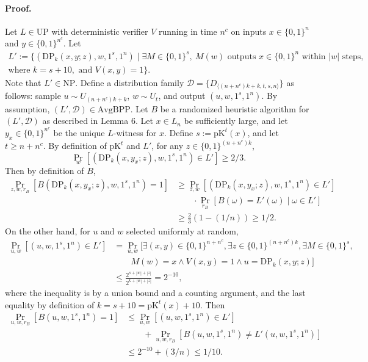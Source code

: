 \documentclass[10pt,a4paper]{article}
\begin{document}
\paragraph{Proof.} Let $L\in\mathrm{UP}$ with deterministic verifier $V$ running in time $n^c$ on inputs $x\in\{0,1\}^n$ and $y\in\{0,1\}^{n^c}$. Let
\begin{multline*}
L':=\{(\mathrm{DP}_k(x,y;z),w,1^s,1^n)\mid\exists M\in\{0,1\}^s,\ M(w)\text{ outputs }x\in\{0,1\}^n\text{ within }|w|\text{ steps},\\
\text{where }k=s+10,\text{ and }V(x,y)=1\}.
\end{multline*}
Note that $L'\in\mathrm{NP}$. Define a distribution family $\mathcal D=\{D_{\langle(n+n^c)k+k,t,s,n\rangle}\}$ as follows: sample $u\sim U_{(n+n^c)k+k}$, $w\sim U_t$, and output $(u,w,1^s,1^n)$. By assumption, $(L',\mathcal D)\in\mathrm{AvgBPP}$. Let $B$ be a randomized heuristic algorithm for $(L',\mathcal D)$ as described in Lemma 6.
Let $x\in L_n$ be sufficiently large, and let $y_x\in\{0,1\}^{n^c}$ be the unique $L$-witness for $x$. Define $s:=\mathrm{pK}^t(x)$, and let $t\geq n+n^c$. By definition of $\mathrm{pK}^t$ and $L'$, for any $z\in\{0,1\}^{(n+n^c)k}$,
\[\Pr_w[(\mathrm{DP}_k(x,y_x;z),w,1^s,1^n)\in L']\geq2/3.\]
Then by definition of $B$,
\begin{align*}
\Pr_{z,w,r_B}[B(\mathrm{DP}_k(x,y_x;z),w,1^s,1^n)=1]
&\geq\Pr_{z,w}[(\mathrm{DP}_k(x,y_x;z),w,1^s,1^n)\in L']\\
&\qquad\cdot\Pr_{r_B}[B(\omega)=L'(\omega)\mid\omega\in L']\\
&\geq\frac23(1-(1/n))\geq1/2.\tag{22}
\end{align*}
On the other hand, for $u$ and $w$ selected uniformly at random,
\begin{align*}
\Pr_{u,w}[(u,w,1^s,1^n)\in L']
&=\Pr_{u,w}[\exists(x,y)\in\{0,1\}^{n+n^c},\exists z\in\{0,1\}^{(n+n^c)k},\exists M\in\{0,1\}^s,\\
&\qquad M(w)=x\wedge V(x,y)=1\wedge u=\mathrm{DP}_k(x,y;z)]\\
&\leq\frac{2^{s+|w|+|z|}}{2^{k+|w|+|z|}}=2^{-10},
\end{align*}
where the inequality is by a union bound and a counting argument, and the last equality by definition of $k=s+10=\mathrm{pK}^t(x)+10$. Then
\begin{align*}
\Pr_{u,w,r_B}[B(u,w,1^s,1^n)=1]
&\leq\Pr_{u,w}[(u,w,1^s,1^n)\in L']\\
&\qquad+\Pr_{u,w,r_B}[B(u,w,1^s,1^n)\neq L'(u,w,1^s,1^n)]\\
&\leq2^{-10}+(3/n)\leq1/10.
\end{align*}
\end{document}
